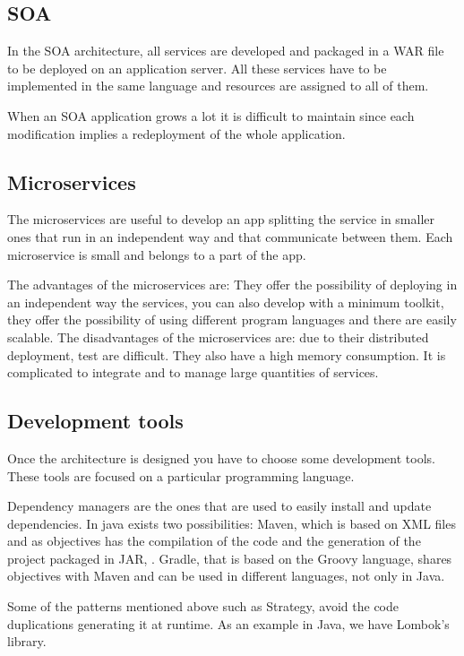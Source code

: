 \documentclass[12pt]{report} %
\begin{document}
\subsection{SOA}

In the SOA architecture, all services are developed and packaged in a WAR file to be deployed on an application server. All these services have to be implemented in the same language and resources are assigned to all of them.

When an SOA application grows a lot it is difficult to maintain since each modification implies a redeployment of the whole application.

\subsection{Microservices}

The microservices are useful to develop an app splitting the service in smaller ones that run in an independent way and that communicate between them. Each microservice is small and belongs to a part of the app.

The advantages of the microservices are: They offer the possibility of deploying in an independent way the services, you can also develop with a minimum toolkit, they offer the possibility of using different program languages and there are easily scalable. The disadvantages of the microservices are: due to their distributed deployment, test are difficult. They also have a high memory consumption. It is complicated to integrate and to manage large quantities of services. 

\subsection{Development tools}

Once the architecture is designed you have to choose some development tools. These tools are focused on a particular programming language.

Dependency managers are the ones that are used to easily install and update dependencies. In java exists two possibilities: Maven, which is based on XML files and  as objectives has the compilation of the code and the generation of the project packaged in JAR, . Gradle, that  is based on the Groovy language, shares objectives with Maven and can be used in different languages, not only in Java.

Some of the patterns mentioned above such as Strategy, avoid the code duplications generating it at runtime. As an example in Java, we have Lombok's library.
\end{document}
